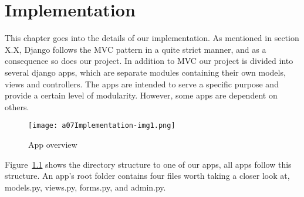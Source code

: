 \chapter{Implementation}

This chapter goes into the details of our implementation. As mentioned
in section X.X, Django follows the MVC pattern in a quite strict
manner, and as a consequence so does our project. In addition to MVC
our project is divided into several django apps, which are separate
modules containing their own models, views and controllers. The apps
are intended to serve a specific purpose and provide a certain level of
modularity. However, some apps are dependent on others.


\bigskip

\begin{figure}
	\texttt{[image: a07Implementation-img1.png]}
	\caption{App overview}
	\label{fig:appOverview}
\end{figure}


\bigskip

Figure~\ref{fig:appOverview} shows the directory structure to one of our apps, all apps
follow this structure. An app{\textquoteright}s root folder contains
four files worth taking a closer look at, models.py, views.py,
forms.py, and admin.py. 


\bigskip

